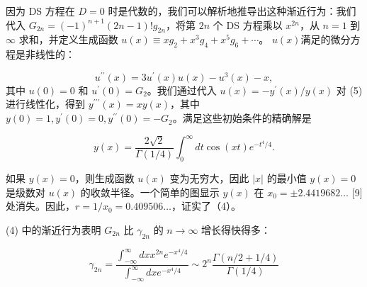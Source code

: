 \documentclass[UTF8]{ctexart}
\begin{document}
因为 DS 方程在 \(D=0\) 时是代数的，我们可以解析地推导出这种渐近行为：我们代入 \(G_{2 n}=(-1)^{n+1}(2 n-1) ! g_{2 n}\)，将第 \(2 n\) 个 DS 方程乘以 \(x^{2 n}\)，从 \(n=1\) 到 \(\infty\) 求和，并定义生成函数 \(u(x) \equiv x g_2+x^3 g_4+x^5 g_6+\cdots\)。 \(u(x)\)满足的微分方程是非线性的：




\[u^{\prime \prime}(x)=3 u^{\prime}(x) u(x)-u^3(x)-x,
\] 其中 \(u(0)=0\) 和 \(u^{\prime}(0)=G_2\)。我们通过代入 \(u(x)=-y^{\prime}(x) / y(x)\) 对 (5) 进行线性化，得到 \(y^{\prime \prime \prime}(x)=x y(x)\)，其中 \(y(0)=1, y^{\prime}(0)=0, y^{\prime \prime}(0)=-G_2\)。满足这些初始条件的精确解是




\[y(x)=\frac{2 \sqrt{2}}{\Gamma(1 / 4)} \int_0^{\infty} d t \cos (x t) e^{-t^4 / 4} .
\]


如果 \(y(x)=0\)，则生成函数 \(u(x)\) 变为无穷大，因此 \(|x|\) 的最小值 \(y(x)=0\) 是级数对 \(u(x)\) 的收敛半径。一个简单的图显示 \(y(x)\) 在 \(x_0= \pm 2.4419682 \ldots\) [9] 处消失。因此，\(r=1 / x_0=0.409506 \ldots\)，证实了（4）。



(4) 中的渐近行为表明 \(G_{2 n}\) 比 \(\gamma_{2 n}\) 的 \(n \rightarrow \infty\) 增长得快得多：


\[
\gamma_{2 n}=\frac{\int_{-\infty}^{\infty} d x x^{2 n} e^{-x^4 / 4}}{\int_{-\infty}^{\infty} d x e^{-x^4 / 4}} \sim 2^n \frac{\Gamma(n / 2+1 / 4)}{\Gamma(1 / 4)}
\]
\end{document}
